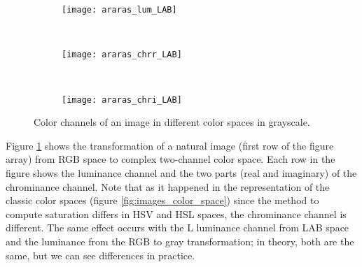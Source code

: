 \begin{figure}[!ht]
    \begin{subfigure}[t]{\textwidth+20pt\relax}
    	\texttt{[image: araras\_lum\_LAB]}
    \end{subfigure}     
    ~ %
    \begin{subfigure}[b]{0.3\textwidth}
        \texttt{[image: araras\_chrr\_LAB]}
    \end{subfigure}
    ~ %
    \begin{subfigure}[b]{0.3\textwidth}
        \texttt{[image: araras\_chri\_LAB]}
    \end{subfigure} \vspace{5pt} 
        
    \caption{Color channels of an image in different color spaces in grayscale.}\label{fig:images_color_complex_space}    
\end{figure}

Figure \ref{fig:images_color_complex_space} shows the transformation of a natural image (first row of the figure array) from RGB space to complex two-channel color space. Each row in the figure shows the luminance channel and the two parts (real and imaginary) of the chrominance channel. Note that as it happened in the representation of the classic color spaces (figure \ref{fig:images_color_space}) since the method to compute saturation differs in HSV and HSL spaces, the chrominance channel is different. The same effect occurs with the L luminance channel from LAB space and the luminance from the RGB to gray transformation; in theory, both are the same, but we can see differences in practice.


%
%
%
%
%
%


